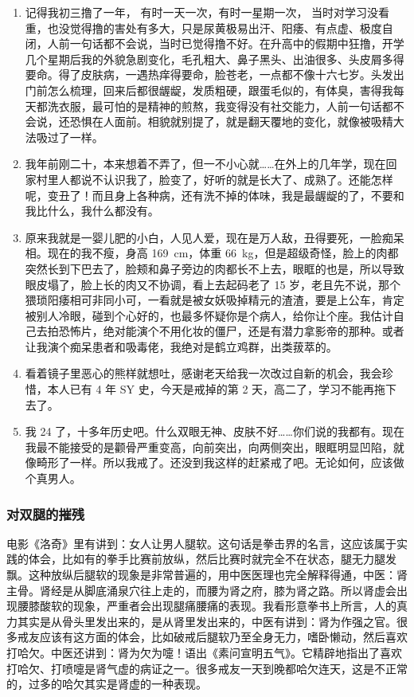\documentclass{ctexart}
\begin{document}
\begin{enumerate}
    \item 记得我初三撸了一年， 有时一天一次，有时一星期一次， 当时对学习没看重，也没觉得撸的害处有多大，只是尿黄极易出汗、阳痿、有点虚、极度自闭，人前一句话都不会说，当时已觉得撸不好。在升高中的假期中狂撸，开学几个星期后我的外貌急剧变化，毛孔粗大、鼻子黑头、出油很多、头皮屑多得要命。得了皮肤病，一遇热痒得要命，脸苍老，一点都不像十六七岁。头发出门前怎么梳理，回来后都很龌龊，发质粗硬，跟蛋毛似的，有体臭，害得我每天都洗衣服，最可怕的是精神的煎熬，我变得没有社交能力，人前一句话都不会说，还恐惧在人面前。相貌就别提了，就是翻天覆地的变化，就像被吸精大法吸过了一样。
    \item 我年前刚二十，本来想着不弄了，但一不小心就……在外上的几年学，现在回家村里人都说不认识我了，脸变了，好听的就是长大了、成熟了。还能怎样呢，变丑了！而且身上各种病，还有洗不掉的体味，我是最龌龊的了，不要和我比什么，我什么都没有。
    \item 原来我就是一婴儿肥的小白，人见人爱，现在是万人敌，丑得要死，一脸痴呆相。现在的我不瘦，身高 \SI{169}{\centi\metre}，体重 \SI{66}{\kilo\gram}，但是超级奇怪，脸上的肉都突然长到下巴去了，脸颊和鼻子旁边的肉都长不上去，眼眶的也是，所以导致眼皮塌了，脸上长的肉又不协调，看上去起码老了 15 岁，老且先不说，那个猥琐阳痿相可非同小可，一看就是被女妖吸掉精元的渣渣，要是上公车，肯定被别人冷眼，碰到个心好的，也最多怀疑你是个病人，给你让个座。我估计自己去拍恐怖片，绝对能演个不用化妆的僵尸，还是有潜力拿影帝的那种。或者让我演个痴呆患者和吸毒佬，我绝对是鹤立鸡群，出类菝萃的。
    \item 看着镜子里恶心的熊样就想吐，感谢老天给我一次改过自新的机会，我会珍惜，本人已有 4 年 SY 史，今天是戒掉的第 2 天，高二了，学习不能再拖下去了。
    \item 我 24 了，十多年历史吧。什么双眼无神、皮肤不好……你们说的我都有。现在我最不能接受的是颧骨严重变高，向前突出，向两侧突出，眼眶明显凹陷，就像畸形了一样。所以我戒了。还没到我这样的赶紧戒了吧。无论如何，应该做个真男人。
\end{enumerate}

\subsubsection{对双腿的摧残}

电影《洛奇》里有讲到：女人让男人腿软。这句话是拳击界的名言，这应该属于实践的体会，比如有的拳手比赛前放纵，然后比赛时就完全不在状态，腿无力腿发飘。这种放纵后腿软的现象是非常普遍的，用中医医理也完全解释得通，中医：肾主骨。肾经是从脚底涌泉穴往上走的，而腰为肾之府，膝为肾之路。所以肾虚会出现腰膝酸软的现象，严重者会出现腿痛腰痛的表现。我看形意拳书上所言，人的真力其实是从骨头里发出来的，是从肾里发出来的，中医有讲到：肾为作强之官。很多戒友应该有这方面的体会，比如破戒后腿软乃至全身无力，嗜卧懒动，然后喜欢打哈欠。中医还讲到：肾为欠为嚏！语出《素问宣明五气》。它精辟地指出了喜欢打哈欠、打喷嚏是肾气虚的病证之一。很多戒友一天到晚都哈欠连天，这是不正常的，过多的哈欠其实是肾虚的一种表现。
\end{document}
